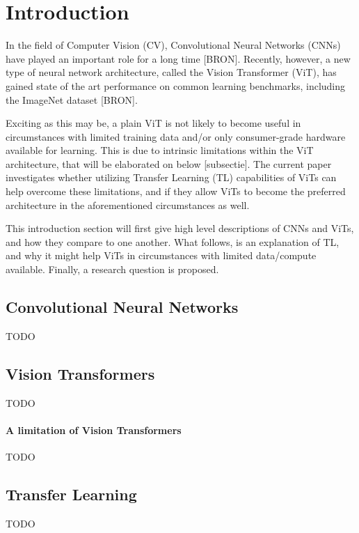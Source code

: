 \section{Introduction}
In the field of Computer Vision (CV), Convolutional Neural Networks (CNNs) have played an important role for a long time [BRON]. Recently, however, a new type of neural network architecture, called the Vision Transformer (ViT), has gained state of the art performance on common learning benchmarks, including the ImageNet dataset [BRON].

Exciting as this may be, a plain ViT is not likely to become useful in circumstances with limited training data and/or only consumer-grade hardware available for learning. This is due to intrinsic limitations within the ViT architecture, that will be elaborated on below [subsectie]. The current paper investigates whether utilizing Transfer Learning (TL) capabilities of ViTs can help overcome these limitations, and if they allow ViTs to become the preferred architecture in the aforementioned circumstances as well.

This introduction section will first give high level descriptions of CNNs and ViTs, and how they compare to one another. What follows, is an explanation of TL, and why it might help ViTs in circumstances with limited data/compute available. Finally, a research question is proposed.

\subsection{Convolutional Neural Networks}
TODO

\subsection{Vision Transformers}
TODO

\paragraph{A limitation of Vision Transformers}
TODO

\subsection{Transfer Learning}
TODO


